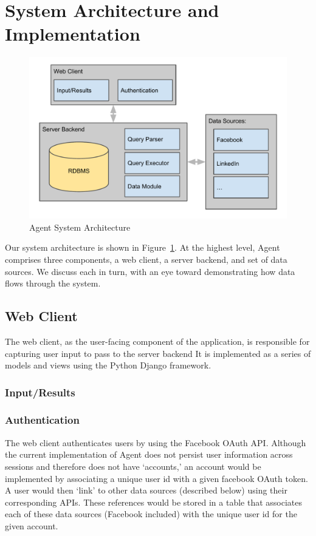 \section{System Architecture and Implementation}
\label{sec:architecture}

\begin{figure}[!h]
\includegraphics[width=\linewidth]{figs/sysarch.pdf}
\caption{Agent System Architecture}
\label{fig:sysarch}
\end{figure}

Our system architecture is shown in Figure~\ref{fig:sysarch}. At the highest
level, Agent comprises three components, a web client, a server backend, and set
of data sources. We discuss each in turn, with an eye toward demonstrating how
data flows through the system.

\subsection{Web Client}
The web client, as the user-facing component of the application, is responsible
for capturing user input to pass to the server backend  It is implemented as a
series of models and views using the Python Django framework.

\subsubsection{Input/Results}

\subsubsection{Authentication}
The web client authenticates users by using the Facebook OAuth API. Although the
current implementation of Agent does not persist user information across
sessions and therefore does not have `accounts,' an account would be implemented
by associating a unique user id with a given facebook OAuth token. A user would
then `link' to other data sources (described below) using their corresponding
APIs. These references would be stored in a table that associates each of these
data sources (Facebook included) with the unique user id for the given account.

